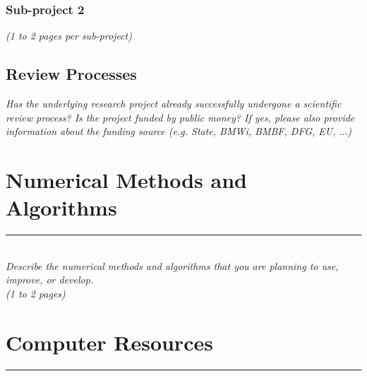 \documentclass [a4paper, 12pt]{article}
\begin{document}
\subsubsection{Sub-project 2}

\textit{(1 to 2 pages per sub-project)}
\subsection{Review Processes}
\textit{Has the underlying research project already successfully undergone a scientific review process? Is the project funded by public money?
If yes, please also provide information about the funding source
(e.g. State, BMWi, BMBF, DFG, EU, $\dots$)}
\section{Numerical Methods and Algorithms} 
\rule{\textwidth}{0.4pt}\\
\textit{Describe the numerical methods and algorithms that you are planning to use, improve, or develop.}\\
 
\textit{(1 to 2 pages)}
\bigskip

\section{Computer Resources}
\rule{\textwidth}{0.4pt}\\
\end{document}
